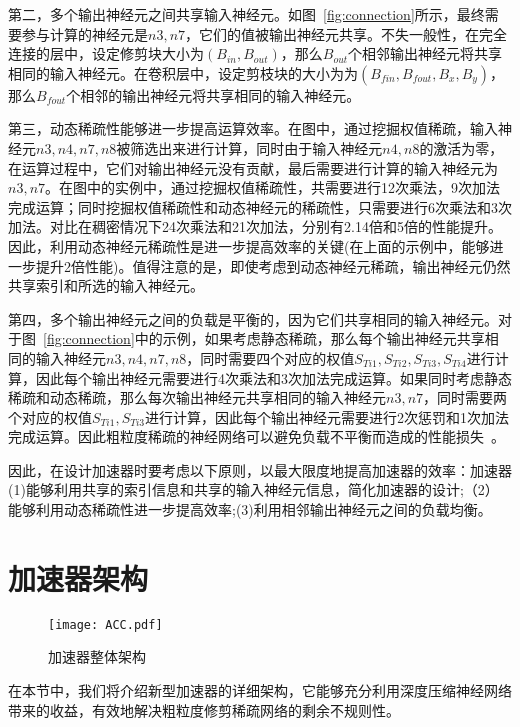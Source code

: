 第二，多个输出神经元之间共享输入神经元。如图~\ref{fig:connection}所示，最终需要参与计算的神经元是$n3, n7$，它们的值被输出神经元共享。不失一般性，在完全连接的层中，设定修剪块大小为$(B_{in},B_{out})$，那么$B_{out}$个相邻输出神经元将共享相同的输入神经元。在卷积层中，设定剪枝块的大小为为$(B_{fin},B_{fout},B_x,B_y)$，那么$B_{fout}$个相邻的输出神经元将共享相同的输入神经元。

第三，动态稀疏性能够进一步提高运算效率。在图中，通过挖掘权值稀疏，输入神经元$n3, n4, n7, n8$被筛选出来进行计算，同时由于输入神经元$n4, n8$的激活为零，在运算过程中，它们对输出神经元没有贡献，最后需要进行计算的输入神经元为$n3, n7$。在图中的实例中，通过挖掘权值稀疏性，共需要进行12次乘法，9次加法完成运算；同时挖掘权值稀疏性和动态神经元的稀疏性，只需要进行6次乘法和3次加法。对比在稠密情况下24次乘法和21次加法，分别有2.14倍和5倍的性能提升。因此，利用动态神经元稀疏性是进一步提高效率的关键(在上面的示例中，能够进一步提升2倍性能)。值得注意的是，即使考虑到动态神经元稀疏，输出神经元仍然共享索引和所选的输入神经元。

第四，多个输出神经元之间的负载是平衡的，因为它们共享相同的输入神经元。对于图~\ref{fig:connection}中的示例，如果考虑静态稀疏，那么每个输出神经元共享相同的输入神经元$n3, n4, n7, n8$，同时需要四个对应的权值$S_{Ti1}, S_{Ti2}, S_{Ti3}, S_{Ti4}$进行计算，因此每个输出神经元需要进行4次乘法和3次加法完成运算。如果同时考虑静态稀疏和动态稀疏，那么每次输出神经元共享相同的输入神经元$n3, n7$，同时需要两个对应的权值$S_{Ti1}, S_{Ti3}$进行计算，因此每个输出神经元需要进行2次惩罚和1次加法完成运算。因此粗粒度稀疏的神经网络可以避免负载不平衡而造成的性能损失~\cite{han2017ese}。

因此，在设计加速器时要考虑以下原则，以最大限度地提高加速器的效率：加速器(1)能够利用共享的索引信息和共享的输入神经元信息，简化加速器的设计;（2）能够利用动态稀疏性进一步提高效率;(3)利用相邻输出神经元之间的负载均衡。


\section{加速器架构}
\begin{figure}[h]
\centering
\texttt{[image: ACC.pdf]}
\caption{加速器整体架构}
\label{fig:acc}
\end{figure}

在本节中，我们将介绍新型加速器的详细架构，它能够充分利用深度压缩神经网络带来的收益，有效地解决粗粒度修剪稀疏网络的剩余不规则性。

